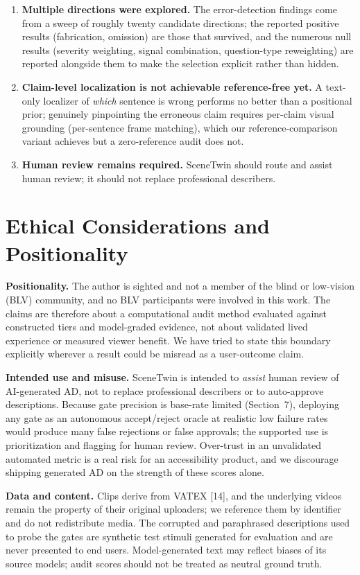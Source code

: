 \documentclass[10pt,twocolumn]{article}
\begin{document}
\begin{enumerate}[leftmargin=*]
\item \textbf{Multiple directions were explored.} The error-detection findings come from a sweep of roughly twenty candidate directions; the reported positive results (fabrication, omission) are those that survived, and the numerous null results (severity weighting, signal combination, question-type reweighting) are reported alongside them to make the selection explicit rather than hidden.
\item \textbf{Claim-level localization is not achievable reference-free yet.} A text-only localizer of \emph{which} sentence is wrong performs no better than a positional prior; genuinely pinpointing the erroneous claim requires per-claim visual grounding (per-sentence frame matching), which our reference-comparison variant achieves but a zero-reference audit does not.
\item \textbf{Human review remains required.} SceneTwin should route and assist human review; it should not replace professional describers.
\end{enumerate}

\section{Ethical Considerations and Positionality}

\textbf{Positionality.} The author is sighted and not a member of the blind or low-vision (BLV) community, and no BLV participants were involved in this work. The claims are therefore about a computational audit method evaluated against constructed tiers and model-graded evidence, not about validated lived experience or measured viewer benefit. We have tried to state this boundary explicitly wherever a result could be misread as a user-outcome claim.

\textbf{Intended use and misuse.} SceneTwin is intended to \emph{assist} human review of AI-generated AD, not to replace professional describers or to auto-approve descriptions. Because gate precision is base-rate limited (Section~7), deploying any gate as an autonomous accept/reject oracle at realistic low failure rates would produce many false rejections or false approvals; the supported use is prioritization and flagging for human review. Over-trust in an unvalidated automated metric is a real risk for an accessibility product, and we discourage shipping generated AD on the strength of these scores alone.

\textbf{Data and content.} Clips derive from VATEX [14], and the underlying videos remain the property of their original uploaders; we reference them by identifier and do not redistribute media. The corrupted and paraphrased descriptions used to probe the gates are synthetic test stimuli generated for evaluation and are never presented to end users. Model-generated text may reflect biases of its source models; audit scores should not be treated as neutral ground truth.
\end{document}
